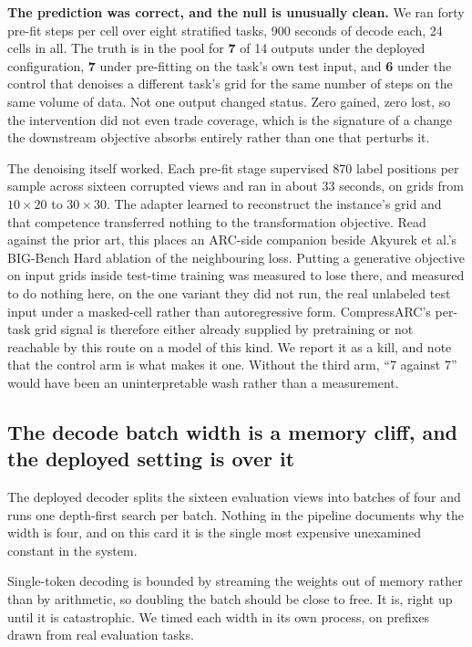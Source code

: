 \documentclass[11pt]{article}
\begin{document}
\textbf{The prediction was correct, and the null is unusually clean.} We ran forty pre-fit steps per cell
over eight stratified tasks, 900 seconds of decode each, 24 cells in all. The truth is in the pool for
\textbf{7} of 14 outputs under the deployed configuration, \textbf{7} under pre-fitting on the
task's own test input, and \textbf{6} under the control that denoises a different task's grid for
the same number of steps on the same volume of data. Not one output changed status. Zero gained,
zero lost, so the intervention did not even trade coverage, which is the signature of a change the
downstream objective absorbs entirely rather than one that perturbs it.

The denoising itself worked. Each pre-fit stage supervised 870 label positions per sample across
sixteen corrupted views and ran in about 33 seconds, on grids from $10\times20$ to $30\times30$. The
adapter learned to reconstruct the instance's grid and that competence transferred nothing to the
transformation objective. Read against the prior art, this places an ARC-side companion beside
Akyurek et al.'s BIG-Bench Hard ablation of the neighbouring loss. Putting a generative objective on
input grids inside test-time training was measured to lose there, and measured to do nothing here,
on the one variant they did not run, the real unlabeled test input under a masked-cell rather than
autoregressive form. CompressARC's per-task grid signal is therefore either already supplied by
pretraining or not reachable by this route on a model of this kind. We report it as a kill, and note
that the control arm is what makes it one. Without the third arm, ``7 against 7'' would have been an
uninterpretable wash rather than a measurement.

\subsection{The decode batch width is a memory cliff, and the deployed setting is over it}
\label{sec:widthcliff}
The deployed decoder splits the sixteen evaluation views into batches of four and runs one
depth-first search per batch. Nothing in the pipeline documents why the width is four, and on this
card it is the single most expensive unexamined constant in the system.

Single-token decoding is bounded by streaming the weights out of memory rather than by arithmetic, so
doubling the batch should be close to free. It is, right up until it is catastrophic. We timed each
width in its own process, on prefixes drawn from real evaluation tasks.
\end{document}

